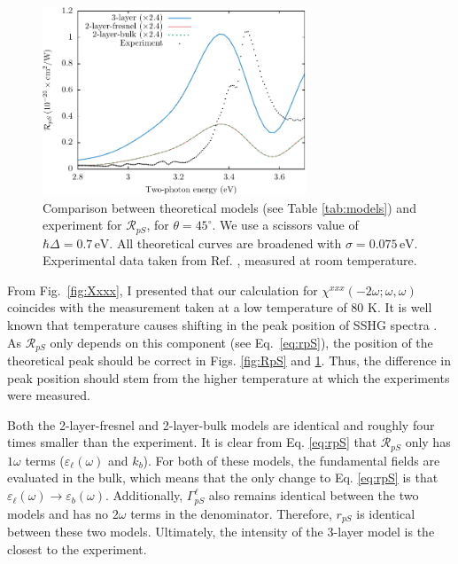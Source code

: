 \begin{figure}
\centering
\includegraphics[width=0.7\textwidth]{figures/fig-4_4_02}
\caption{Comparison between theoretical models (see Table
\ref{tab:models}) and experiment for $\mathcal{R}_{pS}$, for $\theta=45^\circ$.
We use a scissors value of $\hbar\Delta = 0.7\,\text{eV}$. All theoretical
curves are broadened with $\sigma=0.075\,\text{eV}$. Experimental data taken
from Ref. \cite{mitchellSS01}, measured at room temperature.}
\label{fig:mitchellRpS}
\end{figure}

From Fig.~\ref{fig:Xxxx}, I presented that our calculation for
$\chi^{xxx}(-2\omega;\omega,\omega)$ coincides with the measurement taken at a
low temperature of 80 K. It is well known that temperature causes shifting in
the peak position of SSHG spectra \cite{dadapPRB97}. As $\mathcal{R}_{pS}$ only
depends on this component (see Eq.~\eqref{eq:rpS}), the position of the
theoretical peak should be correct in Figs. \ref{fig:RpS} and
\ref{fig:mitchellRpS}. Thus, the difference in peak position should stem from
the higher temperature at which the experiments were measured.

Both the 2-layer-fresnel and 2-layer-bulk models are identical and roughly four
times smaller than the experiment. It is clear from Eq. \eqref{eq:rpS} that
$\mathcal{R}_{pS}$ only has $1\omega$ terms ($\varepsilon_{\ell}(\omega)$ and
$k_{b}$). For both of these models, the fundamental fields are evaluated in the
bulk, which means that the only change to Eq. \eqref{eq:rpS} is that
$\varepsilon_{\ell}(\omega) \rightarrow \varepsilon_{b}(\omega)$. Additionally,
$\Gamma^{\ell}_{pS}$ also remains identical between the two models and has no
$2\omega$ terms in the denominator. Therefore, $r_{pS}$ is identical between
these two models. Ultimately, the intensity of the 3-layer model is the closest
to the experiment.

